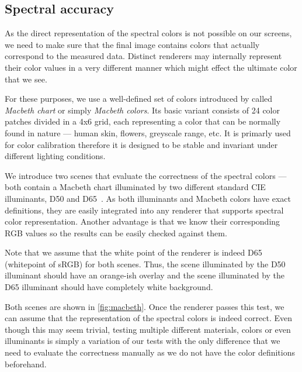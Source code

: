 \subsection{Spectral accuracy}

As the direct representation of the spectral colors is not possible on our screens, we need to make sure that the final image contains colors that actually correspond to the measured data. Distinct renderers may internally represent their color values in a very different manner which might effect the ultimate color that we see.

For these purposes, we use a well-defined set of colors introduced by \citet{mccamy1976color} called \emph{Macbeth chart} or simply \emph{Macbeth colors}. Its basic variant consists of 24 color patches divided in a 4x6 grid, each representing a color that can be normally found in nature --- human skin, flowers, greyscale range, etc. It is primarly used for color calibration therefore it is designed to be stable and invariant under different lighting conditions.

We introduce two scenes that evaluate the correctness of the spectral colors --- both contain a Macbeth chart illuminated by two different standard CIE illuminants, D50 and D65~\cite{cieIlluminants}. As both illuminants and Macbeth colors have exact definitions, they are easily integrated into any renderer that supports spectral color representation. Another advantage is that we know their corresponding RGB values so the results can be easily checked against them.

Note that we assume that the white point of the renderer is indeed D65 (whitepoint of sRGB) for both scenes. Thus, the scene illuminated by the D50 illuminant should have an orange-ish overlay and the scene illuminated by the D65 illuminant should have completely white background.

Both scenes are shown in \autoref{fig:macbeth}. Once the renderer passes this test, we can assume that the representation of the spectral colors is indeed correct. Even though this may seem trivial, testing multiple different materials, colors or even illuminants is simply a variation of our tests with the only difference that we need to evaluate the correctness manually as we do not have the color definitions beforehand.

